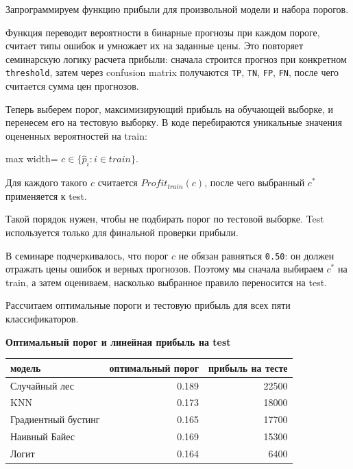 \documentclass[11pt]{article}
\newcounter{none}
\begin{document}
    Запрограммируем функцию прибыли для произвольной модели и набора
порогов.

    Функция переводит вероятности в бинарные прогнозы при каждом пороге,
считает типы ошибок и умножает их на заданные цены. Это повторяет
семинарскую логику расчета прибыли: сначала строится прогноз при
конкретном \texttt{threshold}, затем через confusion matrix получаются
\texttt{TP}, \texttt{TN}, \texttt{FP}, \texttt{FN}, после чего считается
сумма цен прогнозов.

    Теперь выберем порог, максимизирующий прибыль на обучающей выборке, и
перенесем его на тестовую выборку. В коде перебираются уникальные
значения оцененных вероятностей на train:

\begin{center}
\begin{adjustbox}{max width=\linewidth}
\(\displaystyle c \in \{\hat p_i: i \in train\}.\)
\end{adjustbox}
\end{center}

Для каждого такого \(c\) считается \(Profit_{train}(c)\), после чего
выбранный \(c^*\) применяется к test.

    Такой порядок нужен, чтобы не подбирать порог по тестовой выборке. Test
используется только для финальной проверки прибыли.

В семинаре подчеркивалось, что порог \(c\) не обязан равняться
\texttt{0.50}: он должен отражать цены ошибок и верных прогнозов.
Поэтому мы сначала выбираем \(c^*\) на train, а затем оцениваем,
насколько выбранное правило переносится на test.

    Рассчитаем оптимальные пороги и тестовую прибыль для всех пяти
классификаторов.

    \textbf{Оптимальный порог и линейная прибыль на test}

{\def\LTcaptype{none} %
\begin{longtable}[]{@{}lrr@{}}
\toprule\noalign{}
модель & оптимальный порог & прибыль на тесте \\
\midrule\noalign{}
\endhead
\bottomrule\noalign{}
\endlastfoot
Случайный лес & 0.189 & 22500 \\
KNN & 0.173 & 18000 \\
Градиентный бустинг & 0.165 & 17700 \\
Наивный Байес & 0.169 & 15300 \\
Логит & 0.164 & 6400 \\
\end{longtable}
}
\end{document}
